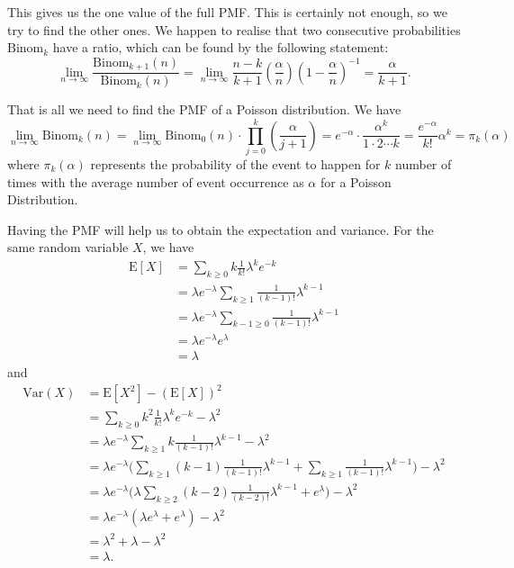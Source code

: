 \documentclass[11pt, a4paper, oneside]{book}
\theoremstyle{definition}
\newcommand{\var}[1]{\text{Var}(#1)}
\newcommand{\E}[1]{\text{E}[#1]}
\begin{document}
\noindent This gives us the one value of the full PMF. This is certainly not enough, so we try to find the other ones. We happen to realise that two consecutive probabilities $\text{Binom}_k$ have a ratio, which can be found by the following statement: \[
\lim_{n \to \infty} \frac{\text{Binom}_{k+1}(n)}{\text{Binom}_{k}(n)} = \lim_{n \to \infty} \frac {n-k}{k+1} (\frac{\alpha}{n})(1-\frac{\alpha}{n})^{-1} = \frac{\alpha}{k+1}.
\]

\noindent That is all we need to find the PMF of a Poisson distribution. We have\[
\lim_{n \to \infty} \text{Binom}_k(n) = \lim_{n \to \infty} \text{Binom}_0(n) \cdot \prod_{j=0}^{k}(\frac{\alpha}{j+1})=e^{-\alpha} \cdot \frac{\alpha^k}{1 \cdot 2 \cdots k} = \frac{e^{-\alpha}}{k!}\alpha^k = \pi_k(\alpha)
\]
where $\pi_k(\alpha)$ represents the probability of the event to happen for $k$ number of times with the average number of event occurrence as $\alpha$ for a Poisson Distribution.

\noindent Having the PMF will help us to obtain the expectation and variance. For the same random variable $X$, we have
\begin{equation*}
\begin{split}
\E{X} &= \sum_{k\ge 0} k\frac{1}{k!}{\lambda}^k e^{-k} \\
&= \lambda e^{-\lambda} \sum_{k\ge 1} \frac{1}{(k-1)!}{\lambda}^{k-1}  \\
&= \lambda e^{-\lambda} \sum_{k-1 \ge 0} \frac{1}{(k-1)!}{\lambda}^{k-1}  \\
&= \lambda e^{-\lambda}e^{\lambda}  \\
&= \lambda
\end{split}
\end{equation*}
and 
\begin{equation*}
\begin{split}
\var{X} &= \E{X^2} - (\E{X})^2 \\
&= \sum_{k\ge 0} k^2\frac{1}{k!}{\lambda}^k e^{-k} - {\lambda}^2 \\
&= \lambda e^{-\lambda} \sum_{k\ge 1} k\frac{1}{(k-1)!}{\lambda}^{k-1} - {\lambda}^2 \\
&= \lambda e^{-\lambda}\Big( \sum_{k\ge 1} (k-1)\frac{1}{(k-1)!}{\lambda}^{k-1} + \sum_{k\ge 1} \frac{1}{(k-1)!}{\lambda}^{k-1} \Big) - {\lambda}^2 \\
&= \lambda e^{-\lambda}\Big( \lambda \sum_{k\ge 2} (k-2)\frac{1}{(k-2)!}{\lambda}^{k-1} + e^{\lambda} \Big) - {\lambda}^2 \\
&= \lambda e^{-\lambda}( \lambda e^{\lambda}+ e^{\lambda} ) - {\lambda}^2 \\
&={\lambda}^2 + \lambda - {\lambda}^2 \\
&= \lambda. \\
\end{split} 
\end{equation*}
\end{document}
